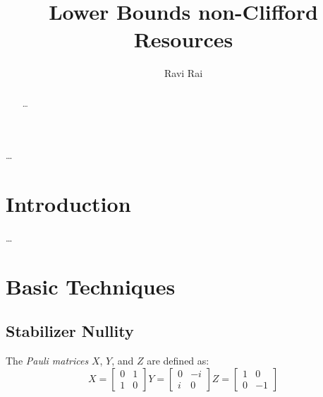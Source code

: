 \documentclass[12pt]{dalthesis}
\begin{document}
\title{Lower Bounds non-Clifford Resources}
\author{Ravi Rai}

\mcs  %




\dedicate{\ldots}

\nolistoftables
\nolistoffigures

\frontmatter

\begin{abstract}
\ldots
\end{abstract}

\begin{acknowledgements}
\ldots
\end{acknowledgements}

\mainmatter

\chapter{Introduction}

\ldots

\chapter{Basic Techniques}

\section{Stabilizer Nullity}

\begin{definition}
The \emph{Pauli matrices} $X$, $Y$, and $Z$ are defined as:
  \[
  X= \begin{bmatrix}
    0 & 1 \\
    1 & 0
  \end{bmatrix}
  Y = \begin{bmatrix}
  0 & -i \\
  i & 0
  \end{bmatrix}
  Z = \begin{bmatrix}
  1 & 0 \\
  0 & -1
  \end{bmatrix}
  \]
\end{definition}
\end{document}
